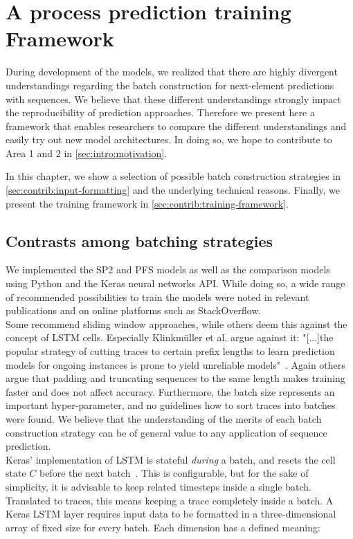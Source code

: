 \chapter{A process prediction training Framework}\label{chap:training-framework}
During development of the models, we realized that there are highly divergent understandings regarding the batch construction for next-element predictions with sequences. We believe that these different understandings strongly impact the reproducibility of prediction approaches. Therefore we present here a framework that enables researchers to compare the different understandings and easily try out new model architectures. In doing so, we hope to contribute to Area 1 and 2 in \autoref{sec:intro:motivation}.

In this chapter, we show a selection of possible batch construction strategies in \autoref{sec:contrib:input-formatting} and the underlying technical reasons. Finally, we present the training framework in \autoref{sec:contrib:training-framework}.

\section{Contrasts among batching strategies}\label{sec:contrib:input-formatting}
We implemented the SP2 and PFS models as well as the comparison models using Python and the Keras neural networks API. While doing so, a wide range of recommended possibilities to train the models were noted in relevant publications and on online platforms such as StackOverflow.\\

Some recommend sliding window approaches, while others deem this against the concept of LSTM cells. Especially Klinkmüller et al. argue against it: "[...]the popular strategy of cutting traces to certain prefix lengths to learn prediction models for ongoing instances is prone to yield unreliable models"~\cite{klinkmuller2018reliablemonitoring}. Again others argue that padding and truncating sequences to the same length makes training faster and does not affect accuracy. Furthermore, the batch size represents an important hyper-parameter, and no guidelines how to sort traces into batches were found. We believe that the understanding of the merits of each batch construction strategy can be of general value to any application of sequence prediction.\\

Keras' implementation of LSTM is stateful \textit{during} a batch, and resets the cell state $C$ before the next batch~\cite{web:keras}. This is configurable, but for the sake of simplicity, it is advisable to keep related timesteps inside a single batch. Translated to traces, this means keeping a trace completely inside a batch. A Keras LSTM layer requires input data to be formatted in a three-dimensional array of fixed size for every batch. Each dimension has a defined meaning:

